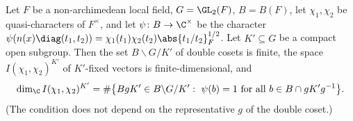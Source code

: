 Let $F$ be a non-archimedean local field, $G=\GL_2(F)$, $B=B(F)$, let $\chi_1,\chi_2$ be quasi-characters of $F^\times$,
and let $\psi\colon B\to\C^\times$ be the character $\psi(n(x)\diag(t_1,t_2))=\chi_1(t_1)\chi_2(t_2)\abs{t_1/t_2}_F^{1/2}$.
Let $K'\subseteq G$ be a compact open subgroup. Then the set $B\backslash G/K'$ of double cosets is finite, the space
$I(\chi_1,\chi_2)^{K'}$ of $K'$-fixed vectors is finite-dimensional, and
\[
  \dim_\C I(\chi_1,\chi_2)^{K'}=\#\bigl\{BgK'\in B\backslash G/K':\ \psi(b)=1\text{ for all }b\in B\cap gK'g^{-1}\bigr\}.
\]
(The condition does not depend on the representative $g$ of the double coset.)
